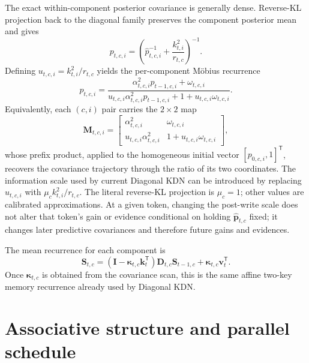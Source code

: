 \documentclass[11pt]{article}
\newcommand{\ve}[1]{\boldsymbol{#1}}
\newcommand{\tr}{\mathsf{T}}
\begin{document}
The exact within-component posterior covariance is generally dense.  Reverse-KL projection back to the
diagonal family preserves the component posterior mean and gives
\begin{equation}
  p_{t,c,i}
  =\left(
     \widehat p_{t,c,i}^{-1}
     +\frac{k_{t,i}^2}{r_{t,c}}
   \right)^{-1}.
  \label{eq:kdn3-diagonal-projection}
\end{equation}
Defining $u_{t,c,i}=k_{t,i}^2/r_{t,c}$ yields the per-component M\"obius recurrence
\begin{equation}
  p_{t,c,i}
  =\frac{
     \alpha_{t,c,i}^2p_{t-1,c,i}+\omega_{t,c,i}
   }{
     u_{t,c,i}\alpha_{t,c,i}^2p_{t-1,c,i}
     +1+u_{t,c,i}\omega_{t,c,i}
   }.
  \label{eq:kdn3-diagonal-mobius}
\end{equation}
Equivalently, each $(c,i)$ pair carries the $2\times2$ map
\begin{equation}
  \ve{M}_{t,c,i}
  =\begin{bmatrix}
     \alpha_{t,c,i}^2 & \omega_{t,c,i}\\
     u_{t,c,i}\alpha_{t,c,i}^2 & 1+u_{t,c,i}\omega_{t,c,i}
   \end{bmatrix},
  \label{eq:kdn3-diagonal-mobius-matrix}
\end{equation}
whose prefix product, applied to the homogeneous initial vector
$[p_{0,c,i},1]^{\tr}$, recovers the covariance trajectory through the ratio of its two
coordinates.  The information scale used by current Diagonal KDN can be introduced by replacing
$u_{t,c,i}$ with $\mu_c k_{t,i}^2/r_{t,c}$.  The literal reverse-KL projection is $\mu_c=1$;
other values are calibrated approximations.  At a given token, changing the post-write scale does
not alter that token's gain or evidence conditional on holding
$\widehat{\ve{p}}_{t,c}$ fixed; it changes later predictive covariances and therefore future gains
and evidences.

The mean recurrence for each component is
\begin{equation}
  \ve{S}_{t,c}
  =(\ve{I}-\ve{\kappa}_{t,c}\ve{k}_t^{\tr})
    \ve{D}_{t,c}\ve{S}_{t-1,c}
   +\ve{\kappa}_{t,c}\ve{v}_t^{\tr}.
  \label{eq:kdn3-diagonal-memory-recurrence}
\end{equation}
Once $\ve{\kappa}_{t,c}$ is obtained from the covariance scan, this is the same affine two-key
memory recurrence already used by Diagonal KDN.

\section{Associative structure and parallel schedule}
\label{sec:kdn3-parallelism}
\end{document}
